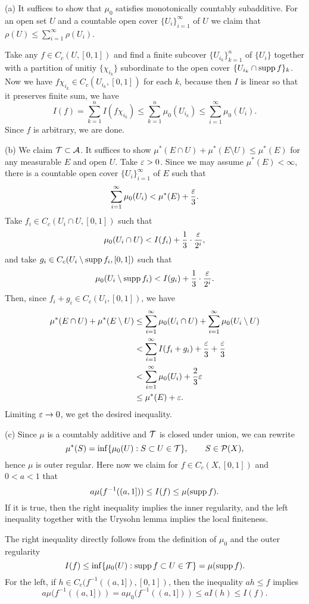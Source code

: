 \documentclass{../../large}
\begin{document}
\begin{pf}
(a)
It suffices to show that $\mu_0$ satisfies monotonically countably subadditive.
For an open set $U$ and a countable open cover $\{U_i\}_{i=1}^\infty$ of $U$ we claim that $\rho(U)\le\sum_{i=1}^\infty\rho(U_i)$.

Take any $f\in C_c(U,[0,1])$ and find a finite subcover $\{U_{i_k}\}_{k=1}^n$ of $\{U_i\}$ together with a partition of unitiy $\{\chi_{i_k}\}$ subordinate to the open cover $\{U_{i_k}\cap\operatorname{supp} f\}_k$.
Now we have $f\chi_{i_k}\in C_c(U_{i_k},[0,1])$ for each $k$, because then $I$ is linear so that it preserves finite sum, we have
\[I(f)=\sum_{k=1}^n I(f\chi_{i_k})\le\sum_{k=1}^n\mu_0(U_{i_k})\le\sum_{i=1}^\infty\mu_0(U_i).\]
Since $f$ is arbitrary, we are done.

(b)
We claim $\mathcal{T}\subset\mathcal{A}$.
It suffices to show $\mu^*(E\cap U)+\mu^*(E\setminus U)\le\mu^*(E)$ for any measurable $E$ and open $U$.
Take $\varepsilon>0$.
Since we may assume $\mu^*(E)<\infty$, there is a countable open cover $\{U_i\}_{i=1}^\infty$ of $E$ such that
\[\sum_{i=1}^\infty\mu_0(U_i)<\mu^*(E)+\frac{\varepsilon}3.\]
Take $f_i\in C_c(U_i\cap U,[0,1])$ such that
\[\mu_0(U_i\cap U)<I(f_i)+\frac13\cdot\frac{\varepsilon}{2^i},\]
and take $g_i\in C_c(U_i\setminus\operatorname{supp} f_i,[0,1])$ such that
\[\mu_0(U_i\setminus\operatorname{supp} f_i)<I(g_i)+\frac13\cdot\frac{\varepsilon}{2^i}.\]
Then, since $f_i+g_i\in C_c(U_i,[0,1])$, we have
\begin{align*}
\mu^*(E\cap U)+\mu^*(E\setminus U)
&\le\sum_{i=1}^\infty\mu_0(U_i\cap U)+\sum_{i=1}^\infty\mu_0(U_i\setminus U)\\
&<\sum_{i=1}^\infty I(f_i+g_i)+\frac{\varepsilon}3+\frac{\varepsilon}3\\
&<\sum_{i=1}^\infty\mu_0(U_i)+\frac23\varepsilon\\
&\le\mu^*(E)+\varepsilon.
\end{align*}
Limiting $\varepsilon\to0$, we get the desired inequality.

(c)
Since $\mu$ is a countably additive and $\mathcal{T}$ is closed under union, we can rewrite
\[\mu^*(S)=\inf\{\mu_0(U):S\subset U\in\mathcal{T}\},\qquad S\in\mathcal{P}(X),\]
hence $\mu$ is outer regular.
Here now we claim for $f\in C_c(X,[0,1])$ and $0<a<1$ that
\[a\mu(f^{-1}((a,1]))\le I(f)\le\mu(\operatorname{supp} f).\]
If it is true, then the right inequality implies the inner regularity, and the left inequality together with the Urysohn lemma implies the local finiteness.

The right inequality directly follows from the definition of $\mu_0$ and the outer regularity
\[I(f)\le\inf\{\mu_0(U):\operatorname{supp} f\subset U\in\mathcal{T}\}=\mu(\operatorname{supp} f).\]
For the left, if $h\in C_c(f^{-1}((a,1]),[0,1])$, then the inequality $ah\le f$ implies
\[a\mu(f^{-1}((a,1]))=a\mu_0(f^{-1}((a,1]))\le aI(h)\le I(f).\]


\end{pf}
\end{document}
